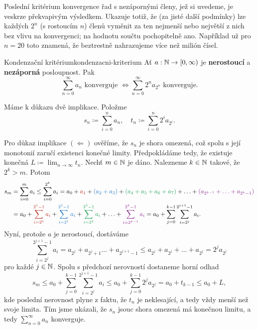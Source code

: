 Poslední kritérium konvergence řad s nezápornými členy, jež si uvedeme, je
veskrze překvapivým výsledkem. Ukazuje totiž, že (za jisté další podmínky) lze
každých $2^{n}$ (s rostoucím $n$) členů vyměnit za ten nejmenší nebo největší z
nich bez vlivu na konvergenci; na hodnotu součtu pochopitelně ano. Například už
pro $n = 20$ toto znamená, že beztrestně nahrazujeme více než milión čísel.

\begin{theorem}{Kondenzační kritérium}{kondenzacni-kriterium}
 Ať $a:\mathbb{N} \to [0,\infty)$ je \textbf{nerostoucí} a \textbf{nezáporná}
 posloupnost. Pak
 \[
  \sum_{n=0}^{\infty} a_n \text{ konverguje } \Leftrightarrow
  \sum_{n=0}^{\infty} 2^{n}a_{2^{n}} \text{ konverguje}.
 \]
\end{theorem}
\begin{thmproof}
 Máme k důkazu dvě implikace. Položme
 \[
  s_n \coloneqq \sum_{i=0}^{n} a_n, \quad t_n \coloneqq \sum_{i=0}^{n}
  2^{i}a_{2^{i}}.
 \]

 Pro důkaz implikace $(\Leftarrow)$ ověříme, že $s_n$ je shora omezená, což
 spolu s její monotonií zaručí existenci konečné limity. Předpokládáme tedy, že
 existuje konečná $L \coloneqq \lim_{n \to \infty} t_n$. Nechť $m \in \mathbb{N}$ je
 dáno. Nalezneme $k \in \mathbb{N}$ takové, že $2^{k} > m$. Potom
 \begin{align*}
  s_m &= \sum_{i=0}^{m} a_i \leq \sum_{i=0}^{2^{k}} a_i = a_0 + \clr{a_1} +
  \clb{(a_2 + a_3)} + \clg{(a_4 + a_5 + a_6 + a_7)} + \ldots + \clm{(a_{2^{k-1}}
  + \ldots + a_{2^{k} - 1})}\\
      &= a_0 + \clr{\sum_{i=2^{0}}^{2^{1}-1} a_i} + \clb{\sum_{i=2^{1}}^{2^2-1}
      a_i} + \clg{\sum_{i=2^2}^{2^{3}-1} a_i} + \ldots +
      \clm{\sum_{i=2^{k-1}}^{2^{k}-1} a_i} = a_0 + \sum_{j=0}^{k-1}
      \sum_{i=2^{j}}^{2^{j+1}-1} a_i.
 \end{align*}
 Nyní, protože $a$ je nerostoucí, dostáváme
 \[
  \sum_{i=2^{j}}^{2^{j+1}-1} a_i = a_{2^{j}} + a_{2^{j} + 1}\ldots +
  a_{2^{j+1}-1} \leq a_{2^{j}} + a_{2^{j}} + \ldots + a_{2^{j}} = 2^{j}a_{2^{j}}
 \]
 pro každé $j \in \mathbb{N}$. Spolu s předchozí nerovností dostaneme horní odhad
 \[
  s_m \leq a_0 + \sum_{j=0}^{k-1} \sum_{i=2^{j}}^{2^{j+1}-1} a_i \leq
  a_0 + \sum_{j=0}^{k-1} 2^{j}a_{2^{j}} = a_0 + t_{k-1} \leq a_0 + L,
 \]
 kde poslední nerovnost plyne z faktu, že $t_n$ je neklesající, a tedy vždy
 menší než svoje limita. Tím jsme ukázali, že $s_n$ jsouc shora omezená má
 konečnou limitu, a tedy $\sum_{n=0}^{\infty} a_n$ konverguje.


\end{thmproof}
